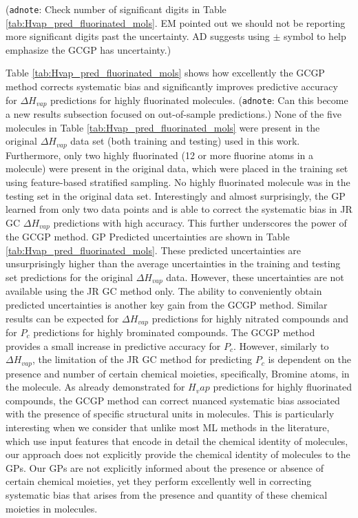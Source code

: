 \documentclass[journal=jacsat,manuscript=article]{achemso}
\newcommand{\adnote}[1]{{\color{OliveGreen} (\texttt{adnote}: #1)}}
\begin{document}
\adnote{Check number of significant digits in Table \ref{tab:Hvap_pred_fluorinated_mols}. EM pointed out we should not be reporting more significant digits past the uncertainty. AD suggests using $\pm$ symbol to help emphasize the GCGP has uncertainty.}

Table \ref{tab:Hvap_pred_fluorinated_mols} shows how excellently the GCGP method corrects systematic bias and significantly improves predictive accuracy for $\Delta H_{vap}$ predictions for highly fluorinated molecules. \adnote{Can this become a new results subsection focused on out-of-sample predictions.} None of the five molecules in Table \ref{tab:Hvap_pred_fluorinated_mols} were present in the original $\Delta H_{vap}$ data set (both training and testing) used in this work. Furthermore, only two highly fluorinated (12 or more fluorine atoms in a molecule) were present in the original data, which were placed in the training set using feature-based stratified sampling. No highly fluorinated molecule was in the testing set in the original data set. Interestingly and almost surprisingly, the GP learned from only two data points and is able to correct the systematic bias in JR GC $\Delta H_{vap}$ predictions with high accuracy. This further underscores the power of the GCGP method. GP Predicted uncertainties are shown in Table \ref{tab:Hvap_pred_fluorinated_mols}. These predicted uncertainties are unsurprisingly higher than the average uncertainties in the training and testing set predictions for the original $\Delta H_{vap}$ data. However, these uncertainties are not available using the JR GC method only. The ability to conveniently obtain predicted uncertainties is another key gain from the GCGP method. 
Similar results can be expected for $\Delta H_{vap}$ predictions for highly nitrated compounds and for $P_c$ predictions for highly brominated compounds. The GCGP method provides a small increase in predictive accuracy for $P_c$. However, similarly to $\Delta H_{vap}$, the limitation of the JR GC method for predicting $P_c$ is dependent on the presence and number of certain chemical moieties, specifically, Bromine atoms, in the molecule. As already demonstrated for $H_vap$ predictions for highly fluorinated compounds, the GCGP method can correct nuanced systematic bias associated with the presence of specific structural units in molecules. This is particularly interesting when we consider that unlike most ML methods in the literature, which use input features that encode in detail the chemical identity of molecules, our approach does not explicitly provide the chemical identity of molecules to the GPs. 
Our GPs are not explicitly informed about the presence or absence of certain chemical moieties, yet they perform excellently well in correcting systematic bias that arises from the presence and quantity of these chemical moieties in molecules.
\end{document}

